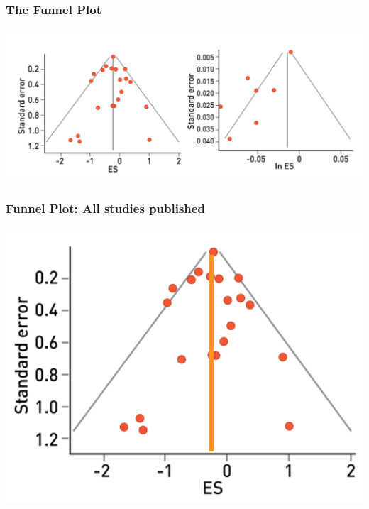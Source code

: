 \documentclass[10pt, block=fill]{beamer}
\begin{document}
\begin{frame}
    \frametitle{The Funnel Plot}
    
    \begin{center}
        \includegraphics[width=1.0\linewidth]{figures/funnel_plot.png}
    \end{center}

\end{frame}


\begin{frame}
    \frametitle{Funnel Plot: All studies published}
    
    \begin{center}
        \includegraphics[width=0.75\linewidth]{figures/funnel_plot_a.png}
    \end{center}
    
\end{frame}
\end{document}
